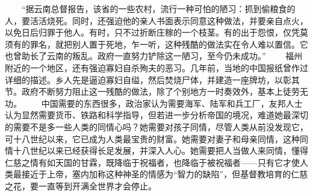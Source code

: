 \documentclass[12pt,oneside]{book}
\begin{document}
\begin{common-format}
　　“据云南总督报告，该省的一些农村，流行一种可怕的陋习：抓到偷粮食的人，要活活烧死。同时，还强迫他的亲人书面表示同意这种做法，并要亲自点火，以免日后归罪于他人。有时，只不过折断庄稼的一个枝茎。有的出于怨恨，仅凭莫须有的罪名，就把别人置于死地，乍一听，这种残酷的做法实在令人难以置信。它也曾助长了云南的叛乱。政府一直努力铲除这一陋习，至今仍未成功。” 
　　福州附近的一个地区，还有强迫寡妇自杀殉夫的恶习。几年前，当地的中国报纸曾作过详细的描述。乡人先是逼迫寡妇自缢，然后焚烧尸体，并建造一座牌坊，以彰其节。政府不断努力阻止这一残酷的做法，除了个别地方一时奏效外，基本上徒劳无功。 
　　中国需要的东西很多，政治家认为需要海军、陆军和兵工厂，友邦人士认为显然需要货币、铁路和科学指导，但若进一步分析帝国的境况，难道她最深切的需要不是多一些人类的同情心吗？她需要对孩子同情，尽管人类从前没发现它，可十八世纪以来，它已成为人类最宝贵的财富。她需要对妻子和母亲同情，这种同情十八世纪以来已经获得长足发展，并深入人心。她需要把人当做人来同情，懂得仁慈之情有如天国的甘霖，既降临于祝福者，也降临于被祝福者——只有它才使人类最接近于上帝，塞内加称这种神圣的情感为“智力的缺陷”，但基督教培育的仁慈之花，要一直等到开满全世界才会停止。 


\end{common-format}
\end{document}
